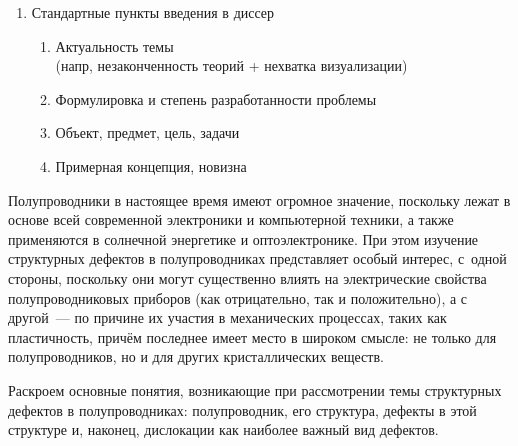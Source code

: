\documentclass[a4paper, 14pt, titlepage]{extarticle}
\begin{document}
\begin{enumerate}
\begin{enumerate}
      \end{enumerate}
    \item Стандартные пункты введения в диссер
      \begin{enumerate}
        \item Актуальность темы\\ (напр, незаконченность теорий + нехватка визуализации)
        \item Формулировка и степень разработанности проблемы
        \item Объект, предмет, цель, задачи
        \item Примерная концепция, новизна
      \end{enumerate}
  \end{enumerate}




  \label{sec:intro}

  Полупроводники в настоящее время имеют огромное значение, поскольку лежат в основе всей
  современной электроники и компьютерной техники, а также применяются в солнечной энергетике и
  оптоэлектронике. При этом изучение структурных дефектов в полупроводниках представляет особый
  интерес, с~одной стороны, поскольку они могут существенно влиять на электрические свойства
  полупроводниковых приборов (как отрицательно, так и положительно), а с другой~--- по причине их
  участия в механических процессах, таких как пластичность, причём последнее имеет место в широком
  смысле: не только для полупроводников, но и для других кристаллических веществ.

  Раскроем основные понятия, возникающие при рассмотрении темы структурных дефектов в полупроводниках:
  полупроводник, его структура, дефекты в этой структуре и, наконец, дислокации как наиболее важный
  вид дефектов.
\end{document}
